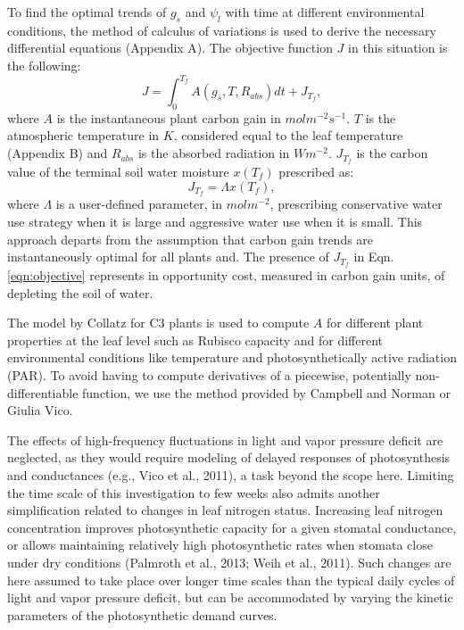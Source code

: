 \documentclass[utf8]{frontiersSCNS} %
\begin{document}
To find the optimal trends of $g_s$ and $\psi_l$ with time at different environmental conditions, the method of calculus of variations is used to derive the necessary differential equations (Appendix A). The objective function $J$ in this situation is the following:
\begin{equation}
    \label{eqn:objective}
    J = \int_0^{T_f} A(g_s,T,R_{abs}) dt + J_{T_f},
\end{equation}
where $A$ is the instantaneous plant carbon gain in $molm^{-2}s^{-1}$. $T$ is the atmospheric temperature in $K$, considered equal to the leaf temperature (Appendix B) and $R_{abs}$ is the absorbed radiation in $Wm^{-2}$. $J_{T_f}$ is the carbon value of the terminal soil water moisture $x(T_f)$ prescribed as:
\begin{equation}
    \label{eqn:terminal_gain}
    J_{T_f} = \Lambda x(T_f),
\end{equation}
where $\Lambda$ is a user-defined parameter, in $mol m^{-2}$, prescribing conservative water use strategy when it is large and aggressive water use when it is small. This approach departs from the assumption that carbon gain trends are instantaneously optimal for all plants and. The presence of $J_{T_f}$ in Eqn. \ref{eqn:objective} represents in opportunity cost, measured in carbon gain units, of depleting the soil of water.

The model by Collatz for C3 plants is used to compute $A$ for different plant properties at the leaf level such as Rubisco capacity and for different environmental conditions like temperature and photosynthetically active radiation (PAR). To avoid having to compute derivatives of a piecewise, potentially non-differentiable function, we use the method provided by Campbell and Norman or Giulia Vico.

The effects of high-frequency
fluctuations in light and vapor pressure deficit are neglected,
as they would require modeling of delayed responses of photosynthesis
and conductances (e.g., Vico et al., 2011), a task
beyond the scope here. Limiting the time scale of this investigation
to few weeks also admits another simplification related
to changes in leaf nitrogen status. Increasing leaf nitrogen concentration
improves photosynthetic capacity for a given stomatal
conductance, or allows maintaining relatively high photosynthetic
rates when stomata close under dry conditions (Palmroth et al.,
2013; Weih et al., 2011). Such changes are here assumed to
take place over longer time scales than the typical daily cycles
of light and vapor pressure deficit, but can be accommodated
by varying the kinetic parameters of the photosynthetic demand
curves.
\end{document}
